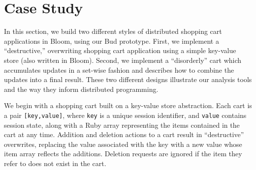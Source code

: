 \section{Case Study}
\label{sec:case}

In this section, we build two different styles of distributed shopping cart
applications in Bloom, using our Bud prototype.  First, we implement a ``destructive,'' overwriting
shopping cart application using a simple key-value store (also written in Bloom).
Second, we implement a ``disorderly'' cart which accumulates updates in a 
set-wise fashion and describes how to combine the updates into a final result.  These two different designs illustrate our analysis tools and the way they inform distributed programming.

We begin with a shopping cart built on a key-value store abstraction.  Each
cart is a pair \texttt{[key,value]}, where \texttt{key} is a unique session
identifier, and \texttt{value} contains session state, along with a Ruby array representing the items contained in the cart at any time.  Addition and deletion actions to a cart
result in ``destructive'' overwrites, replacing the value associated with the
key with a new value whose item array reflects the additions.  Deletion requests are ignored if the item they refer to does not exist in the cart. 

